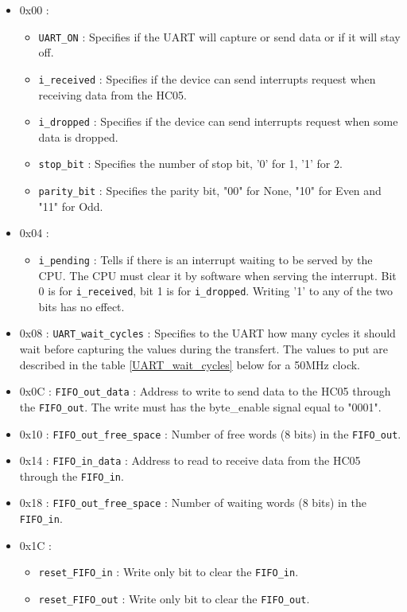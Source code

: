 \documentclass[11pt]{article}
\begin{document}
\begin{itemize}
    \item 0x00 :
    \begin{itemize}
        \item \texttt{UART\_ON} : Specifies if the UART will capture or send data or if it will stay off.
        \item \texttt{i\_received} : Specifies if the device can send interrupts request when receiving data from the HC05.
        \item \texttt{i\_dropped} : Specifies if the device can send interrupts request when some data is dropped.
        \item \texttt{stop\_bit} : Specifies the number of stop bit, '0' for 1, '1' for 2.
        \item \texttt{parity\_bit} : Specifies the parity bit, "00" for None, "10" for Even and "11" for Odd.
    \end{itemize}
    \item 0x04 : 
    \begin{itemize}
        \item \texttt{i\_pending} : Tells if there is an interrupt waiting to be served by the CPU. The CPU must clear it by software when serving the interrupt. Bit 0 is for \texttt{i\_received}, bit 1 is for \texttt{i\_dropped}. Writing '1' to any of the two bits has no effect.
    \end{itemize}
    \item 0x08 : \texttt{UART\_wait\_cycles} : Specifies to the UART how many cycles it should wait before capturing the values during the transfert. The values to put are described in the table \ref{UART_wait_cycles} below for a 50MHz clock. 
    \item 0x0C : \texttt{FIFO\_out\_data} : Address to write to send data to the HC05 through the \texttt{FIFO\_out}. The write must has the byte\_enable signal equal to "0001".
    \item 0x10 : \texttt{FIFO\_out\_free\_space} : Number of free words (8 bits) in the \texttt{FIFO\_out}. 
    \item 0x14 : \texttt{FIFO\_in\_data} : Address to read to receive data from the HC05 through the \texttt{FIFO\_in}. 
    \item 0x18 : \texttt{FIFO\_out\_free\_space} : Number of waiting words (8 bits) in the \texttt{FIFO\_in}. 
    \item 0x1C :
    \begin{itemize}
        \item \texttt{reset\_FIFO\_in} : Write only bit to clear the \texttt{FIFO\_in}.
        \item \texttt{reset\_FIFO\_out} : Write only bit to clear the \texttt{FIFO\_out}.
    \end{itemize}
\end{itemize}
\end{document}
